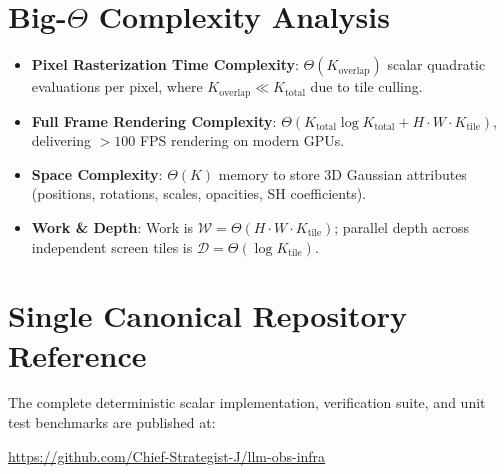 \documentclass[11pt,a4paper]{article}
\theoremstyle{definition}
\begin{document}
\section{Big-$\Theta$ Complexity Analysis}

\begin{itemize}
    \item \textbf{Pixel Rasterization Time Complexity}: $\Theta(K_{\text{overlap}})$ scalar quadratic evaluations per pixel, where $K_{\text{overlap}} \ll K_{\text{total}}$ due to tile culling.
    \item \textbf{Full Frame Rendering Complexity}: $\Theta(K_{\text{total}} \log K_{\text{total}} + H \cdot W \cdot K_{\text{tile}})$, delivering $> 100$ FPS rendering on modern GPUs.
    \item \textbf{Space Complexity}: $\Theta(K)$ memory to store 3D Gaussian attributes (positions, rotations, scales, opacities, SH coefficients).
    \item \textbf{Work \& Depth}: Work is $\mathcal{W} = \Theta(H \cdot W \cdot K_{\text{tile}})$; parallel depth across independent screen tiles is $\mathcal{D} = \Theta(\log K_{\text{tile}})$.
\end{itemize}

\section{Single Canonical Repository Reference}

The complete deterministic scalar implementation, verification suite, and unit test benchmarks are published at:
\begin{center}
\url{https://github.com/Chief-Strategist-J/llm-obs-infra}
\end{center}
\end{document}
